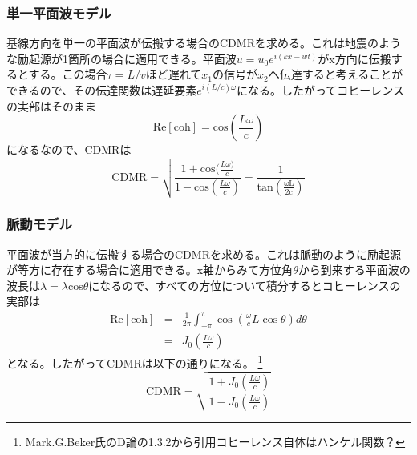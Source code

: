 \subsubsection{単一平面波モデル}
基線方向を単一の平面波が伝搬する場合のCDMRを求める。これは地震のような励起源が1箇所の場合に適用できる。平面波$u=u_0 e^{i(kx-wt)}$がx方向に伝搬するとする。この場合$\tau=L/v$ほど遅れて$x_1$の信号が$x_2$へ伝達すると考えることができるので、その伝達関数は遅延要素$e^{i(L/c)\omega}$になる。したがってコヒーレンスの実部はそのまま
\begin{equation}
  \mathrm{Re}[\mathrm{coh}]=\mathrm{cos}{(\frac{L\omega}{c})}
\end{equation}
になるなので、CDMRは
\begin{equation}
  \boxed{\mathrm{CDMR} = \sqrt{\frac{1+\mathrm{cos}(\frac{L\omega)}{c}}{1-\mathrm{cos}(\frac{L\omega}{c})}} = \frac{1}{\mathrm{tan\left( \frac{\omega{L}}{2c}  \right)}}}
  \label{eq:eq18}
\end{equation}

\subsubsection{脈動モデル}
平面波が当方的に伝搬する場合のCDMRを求める。これは脈動のように励起源が等方に存在する場合に適用できる。x軸からみて方位角$\theta$から到来する平面波の波長は$\lambda=\lambda\mathrm{cos}\theta$になるので、すべての方位について積分するとコヒーレンスの実部は
\begin{eqnarray}
  \mathrm{Re}\left[\mathrm{coh}\right] &=& \frac{1}{2 \pi} \int_{-\pi}^{\pi} \cos \left(\frac{\omega}{c} L\cos \theta\right) d \theta \\
  &=&J_{0}\left(\frac{L\omega}{c}\right)
\end{eqnarray}
となる。したがってCDMRは以下の通りになる。
\footnote[0]{Mark.G.Beker氏のD論の1.3.2から引用コヒーレンス自体はハンケル関数？}
\begin{equation}  \label{eq:eq19}
  \boxed{\mathrm{CDMR} = \sqrt{\frac{1+J_0(\frac{L\omega}{c})}{1-J_0(\frac{L\omega}{c})}}} 
\end{equation}




